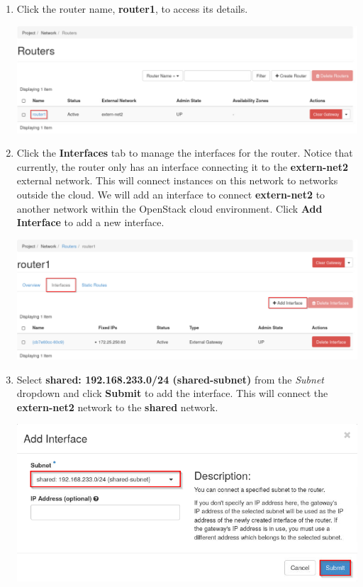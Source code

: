 \documentclass[letterpaper, 12pt]{article}
\begin{document}
\begin{enumerate}
    \item Click the router name, \textbf{router1}, to access its details.

    \begin{center}
        \includegraphics[width=\linewidth]{images/part2/step4.png}
    \end{center}

    \item Click the \textbf{Interfaces} tab to manage the interfaces for the router.
    Notice that currently, the router only has an interface connecting it to the \textbf{extern-net2} external network.
    This will connect instances on this network to networks outside the cloud.
    We will add an interface to connect \textbf{extern-net2} to another network within the OpenStack cloud environment.
    Click \textbf{Add Interface} to add a new interface.

    \begin{center}
        \includegraphics[width=\linewidth]{images/part2/step5.png}
    \end{center}

    \item Select \textbf{shared: 192.168.233.0/24 (shared-subnet)} from the \textit{Subnet} dropdown and click \textbf{Submit} to add the interface.
    This will connect the \textbf{extern-net2} network to the \textbf{shared} network.

    \begin{center}
        \includegraphics[width=\linewidth]{images/part2/step6.png}
    \end{center}


\end{enumerate}
\end{document}
